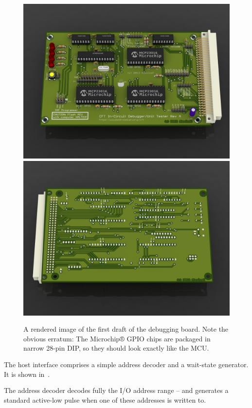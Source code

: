 \begin{figure}
\centering
\includegraphics[width=0.85\columnwidth]{figs/cft-deb-board-128.png}\vspace{1em}\\

\includegraphics[width=0.85\columnwidth]{figs/cft-deb-board-153.png}\\
\caption{\label{fig-deb-board}A rendered image of the first draft of
  the debugging board. Note the obvious erratum: The Microchip®
  \gls{GPIO} chips are packaged in narrow 28-pin DIP, so they should
  look exactly like the \gls{MCU}.}
\end{figure}

The host interface comprises a simple address decoder and a wait-state
generator. It is shown in~.

The address decoder decodes fully the I/O address range
– and generates a standard active-low pulse when
one of these addresses is written to.

